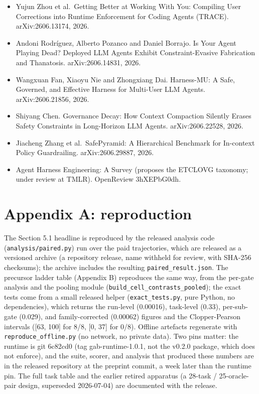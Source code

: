\documentclass[11pt]{article}
\newcommand{\gabarchive}{a repository release, name withheld for review, with SHA-256 checksums}
\newcommand{\gabarchive}{repository release \texttt{gab-run-archive-v1.0}, with SHA-256 checksums}
\begin{document}
\begin{itemize}
\item
  Yujun Zhou et al.~Getting Better at Working With You: Compiling User Corrections into Runtime Enforcement for Coding Agents (TRACE). arXiv:2606.13174, 2026.
\item
  Andoni Rodr\'iguez, Alberto Pozanco and Daniel Borrajo. Is Your Agent Playing Dead? Deployed LLM Agents Exhibit Constraint-Evasive Fabrication and Thanatosis. arXiv:2606.14831, 2026.
\item
  Wangxuan Fan, Xiaoyu Nie and Zhongxiang Dai. Harness-MU: A Safe, Governed, and Effective Harness for Multi-User LLM Agents. arXiv:2606.21856, 2026.
\item
  Shiyang Chen. Governance Decay: How Context Compaction Silently Erases Safety Constraints in Long-Horizon LLM Agents. arXiv:2606.22528, 2026.
\item
  Jiacheng Zhang et al.~SafePyramid: A Hierarchical Benchmark for In-context Policy Guardrailing. arXiv:2606.29887, 2026.
\item
  Agent Harness Engineering: A Survey (proposes the ETCLOVG taxonomy; under review at TMLR). OpenReview 3hXEPbG0dh.
\end{itemize}

\section*{Appendix A: reproduction}\label{appendix-a-reproduction}

The Section 5.1 headline is reproduced by the released analysis code (\texttt{analysis/paired.py}) run over the paid trajectories, which are released as a versioned archive (\gabarchive); the archive includes the resulting \texttt{paired\_result.json}. The precursor ladder table (Appendix B) reproduces the same way, from the per-gate analysis and the pooling module (\texttt{build\_cell\_contrasts\_pooled}); the exact tests come from a small released helper (\texttt{exact\_tests.py}, pure Python, no dependencies), which returns the run-level (0.00016), task-level (0.33), per-sub-gate (0.029), and family-corrected (0.00062) figures and the Clopper-Pearson intervals ({[}63, 100{]} for 8/8, {[}0, 37{]} for 0/8). Offline artefacts regenerate with \texttt{reproduce\_offline.py} (no network, no private data). Two pins matter: the runtime is git 6c82cd0 (tag gab-runtime-1.0.1, not the v0.2.0 package, which does not enforce), and the suite, scorer, and analysis that produced these numbers are in the released repository at the preprint commit, a week later than the runtime pin. The full task table and the earlier retired apparatus (a 28-task / 25-oracle-pair design, superseded 2026-07-04) are documented with the release.
\end{document}
